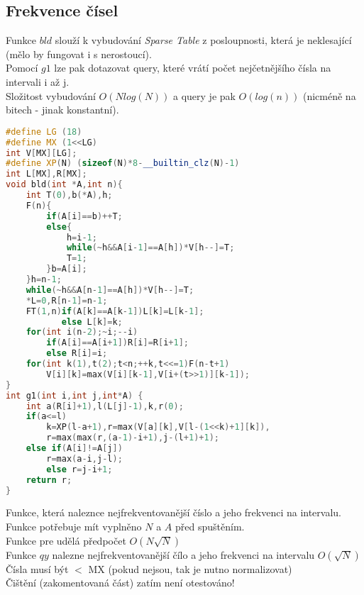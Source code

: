 \documentclass[11pt]{article}
\begin{document}
\subsection{Frekvence čísel}
Funkce $bld$ slouží k vybudování \textit{Sparse Table} z posloupnosti, která je neklesající (mělo by fungovat i s nerostoucí).
\\Pomocí $g1$ lze pak dotazovat query, které vrátí počet nejčetnějšího čísla na intervali \textsf{i} až \textsf{j}.
\\Složitost vybudování $O(Nlog(N))$ a query je pak $O(log(n))$ (nicméně na bitech - jinak konstantní).
\begin{lstlisting}[language=C++]
#define LG (18)
#define MX (1<<LG)
int V[MX][LG];
#define XP(N) (sizeof(N)*8-__builtin_clz(N)-1)
int L[MX],R[MX];
void bld(int *A,int n){
    int T(0),b(*A),h;
    F(n){	
        if(A[i]==b)++T;
        else{
            h=i-1;
            while(~h&&A[i-1]==A[h])*V[h--]=T;
            T=1;
        }b=A[i];
    }h=n-1;
    while(~h&&A[n-1]==A[h])*V[h--]=T;
    *L=0,R[n-1]=n-1;
    FT(1,n)if(A[k]==A[k-1])L[k]=L[k-1];
           else L[k]=k;
    for(int i(n-2);~i;--i)
        if(A[i]==A[i+1])R[i]=R[i+1];
        else R[i]=i;
    for(int k(1),t(2);t<n;++k,t<<=1)F(n-t+1)
        V[i][k]=max(V[i][k-1],V[i+(t>>1)][k-1]);
}
int g1(int i,int j,int*A) {
    int a(R[i]+1),l(L[j]-1),k,r(0);
    if(a<=l)
        k=XP(l-a+1),r=max(V[a][k],V[l-(1<<k)+1][k]),
        r=max(max(r,(a-1)-i+1),j-(l+1)+1);
    else if(A[i]!=A[j])
        r=max(a-i,j-l);
        else r=j-i+1;
    return r;
}
\end{lstlisting}
Funkce, která naleznce nejfrekventovanější číslo a jeho frekvenci na intervalu.
\\Funkce potřebuje mít vyplněno $N$ a $A$ před spuštěním.
\\Funkce pre udělá předpočet $O(N\sqrt{N})$
\\Funkce $qy$ nalezne nejfrekventovanější čílo a jeho frekvenci na intervalu $O(\sqrt{N})$
\\Čísla musí být $<$ MX (pokud nejsou, tak je nutno normalizovat)
\\Čištění (zakomentovaná část) zatím není otestováno!
\end{document}
